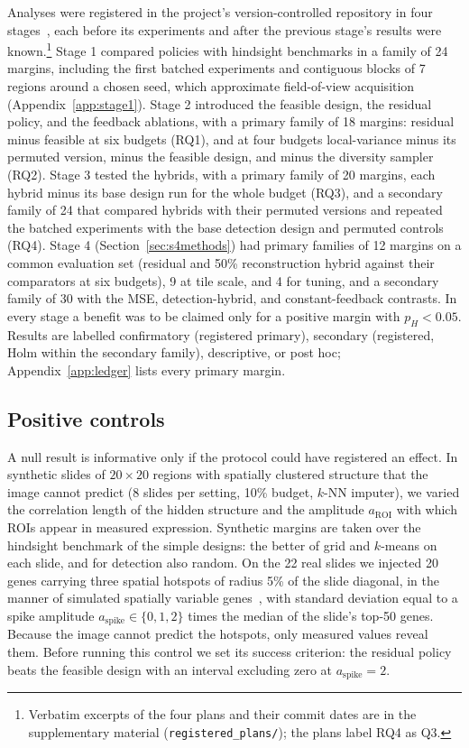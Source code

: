 \documentclass[10pt]{article}
\begin{document}
Analyses were registered in the project's version-controlled repository in four
stages~\citep{nosek2018preregistration}, each before its experiments and after the previous stage's results were
known.\footnote{Verbatim excerpts of the four plans and their commit dates are in the supplementary material
(\texttt{registered\_plans/}); the plans label RQ4 as Q3.} Stage 1 compared policies with hindsight
benchmarks in a family of 24 margins, including the first batched experiments and contiguous blocks of 7 regions
around a chosen seed, which approximate field-of-view acquisition (Appendix~\ref{app:stage1}). Stage 2 introduced
the feasible design, the residual policy, and the feedback ablations, with a primary family
of 18 margins: residual minus feasible at six budgets (RQ1), and at four budgets local-variance minus its permuted
version, minus the feasible design, and minus the diversity sampler (RQ2). Stage 3 tested the hybrids, with a
primary family of 20 margins, each hybrid minus its base design run for the whole budget (RQ3), and a
secondary family of 24 that compared hybrids with their permuted versions and repeated the batched experiments
with the base detection design and permuted controls (RQ4). Stage 4 (Section~\ref{sec:s4methods}) had primary
families of 12 margins on a common evaluation set (residual and 50\% reconstruction hybrid against their
comparators at six budgets), 9 at tile scale, and 4 for tuning, and a secondary family of 30 with the MSE,
detection-hybrid, and constant-feedback contrasts. In every stage a benefit was to be claimed only for a
positive margin with $p_H<0.05$. Results are labelled confirmatory (registered primary), secondary (registered,
Holm within the secondary family), descriptive, or post hoc; Appendix~\ref{app:ledger} lists every primary margin.

\subsection{Positive controls}
A null result is informative only if the protocol could have registered an effect. In synthetic slides of
$20\times20$ regions with spatially clustered structure that the image cannot predict (8 slides per setting, 10\%
budget, $k$-NN imputer), we varied the correlation length of the hidden structure and the amplitude
$a_{\mathrm{ROI}}$ with which ROIs appear in measured expression. Synthetic margins are taken over the hindsight
benchmark of the simple designs: the better of grid and $k$-means on each slide, and for detection also random. On
the 22 real slides we injected 20 genes carrying three spatial hotspots of radius 5\% of the slide diagonal, in the
manner of simulated spatially variable genes~\citep{svensson2018spatialde}, with standard deviation equal to a
spike amplitude $a_{\mathrm{spike}}\in\{0,1,2\}$ times the median of the slide's top-50 genes. Because the image
cannot predict the hotspots, only measured values reveal them. Before running this control we set its success
criterion: the residual policy beats the feasible design with an interval excluding zero at $a_{\mathrm{spike}}=2$.
\end{document}
